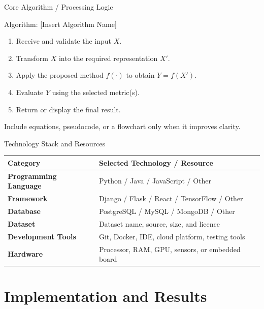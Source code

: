\documentclass[aspectratio=169,11pt]{beamer}
\begin{document}
\begin{frame}{Core Algorithm / Processing Logic}
  \begin{block}{Algorithm: [Insert Algorithm Name]}
    \begin{enumerate}
      \item Receive and validate the input $X$.
      \item Transform $X$ into the required representation $X'$.
      \item Apply the proposed method $f(\cdot)$ to obtain $Y=f(X')$.
      \item Evaluate $Y$ using the selected metric(s).
      \item Return or display the final result.
    \end{enumerate}
  \end{block}
  \vspace{0.2cm}
  \small Include equations, pseudocode, or a flowchart only when it improves clarity.
\end{frame}

\begin{frame}{Technology Stack and Resources}
  \small
  \begin{tabularx}{\textwidth}{>{\bfseries}p{3.1cm}X}
    \toprule
    Category & Selected Technology / Resource \\
    \midrule
    Programming Language & Python / Java / JavaScript / Other \\
    Framework & Django / Flask / React / TensorFlow / Other \\
    Database & PostgreSQL / MySQL / MongoDB / Other \\
    Dataset & Dataset name, source, size, and licence \\
    Development Tools & Git, Docker, IDE, cloud platform, testing tools \\
    Hardware & Processor, RAM, GPU, sensors, or embedded board \\
    \bottomrule
  \end{tabularx}
\end{frame}

\section{Implementation and Results}
\end{document}
